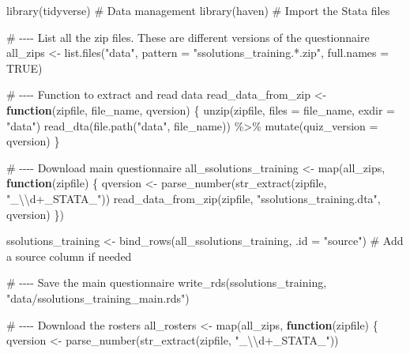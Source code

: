 \documentclass[
  letterpaper,
  DIV=11,
  numbers=noendperiod]{scrreprt}
\newenvironment{Shaded}{\begin{snugshade}}{\end{snugshade}}
\newcommand{\AttributeTok}[1]{\textcolor[rgb]{0.40,0.45,0.13}{#1}}
\newcommand{\CommentTok}[1]{\textcolor[rgb]{0.37,0.37,0.37}{#1}}
\newcommand{\ConstantTok}[1]{\textcolor[rgb]{0.56,0.35,0.01}{#1}}
\newcommand{\ControlFlowTok}[1]{\textcolor[rgb]{0.00,0.23,0.31}{\textbf{#1}}}
\newcommand{\FunctionTok}[1]{\textcolor[rgb]{0.28,0.35,0.67}{#1}}
\newcommand{\NormalTok}[1]{\textcolor[rgb]{0.00,0.23,0.31}{#1}}
\newcommand{\OtherTok}[1]{\textcolor[rgb]{0.00,0.23,0.31}{#1}}
\newcommand{\SpecialCharTok}[1]{\textcolor[rgb]{0.37,0.37,0.37}{#1}}
\newcommand{\StringTok}[1]{\textcolor[rgb]{0.13,0.47,0.30}{#1}}
\begin{document}
\begin{Shaded}
\begin{Highlighting}[]
\FunctionTok{library}\NormalTok{(tidyverse)          }\CommentTok{\# Data management}
\FunctionTok{library}\NormalTok{(haven)              }\CommentTok{\# Import the Stata files}

\CommentTok{\# {-}{-}{-}{-} List all the zip files. These are different versions of the questionnaire}
\NormalTok{all\_zips }\OtherTok{\textless{}{-}} \FunctionTok{list.files}\NormalTok{(}\StringTok{"data"}\NormalTok{, }\AttributeTok{pattern =} \StringTok{"ssolutions\_training.*.zip"}\NormalTok{, }
                       \AttributeTok{full.names =} \ConstantTok{TRUE}\NormalTok{)}

\CommentTok{\# {-}{-}{-}{-} Function to extract and read data}
\NormalTok{read\_data\_from\_zip }\OtherTok{\textless{}{-}} \ControlFlowTok{function}\NormalTok{(zipfile, file\_name, qversion) \{}
  \FunctionTok{unzip}\NormalTok{(zipfile, }\AttributeTok{files =}\NormalTok{ file\_name, }\AttributeTok{exdir =} \StringTok{"data"}\NormalTok{)}
  \FunctionTok{read\_dta}\NormalTok{(}\FunctionTok{file.path}\NormalTok{(}\StringTok{"data"}\NormalTok{, file\_name)) }\SpecialCharTok{\%\textgreater{}\%} \FunctionTok{mutate}\NormalTok{(}\AttributeTok{quiz\_version =}\NormalTok{ qversion)}
\NormalTok{\}}

\CommentTok{\# {-}{-}{-}{-} Download main questionnaire}
\NormalTok{all\_ssolutions\_training }\OtherTok{\textless{}{-}} \FunctionTok{map}\NormalTok{(all\_zips, }\ControlFlowTok{function}\NormalTok{(zipfile) \{}
\NormalTok{  qversion }\OtherTok{\textless{}{-}} \FunctionTok{parse\_number}\NormalTok{(}\FunctionTok{str\_extract}\NormalTok{(zipfile, }\StringTok{"\_}\SpecialCharTok{\textbackslash{}\textbackslash{}}\StringTok{d+\_STATA\_"}\NormalTok{))}
  \FunctionTok{read\_data\_from\_zip}\NormalTok{(zipfile, }\StringTok{"ssolutions\_training.dta"}\NormalTok{, qversion)}
\NormalTok{\})}

\NormalTok{ssolutions\_training }\OtherTok{\textless{}{-}} \FunctionTok{bind\_rows}\NormalTok{(all\_ssolutions\_training, }\AttributeTok{.id =} \StringTok{"source"}\NormalTok{)  }\CommentTok{\# Add a source column if needed}

\CommentTok{\# {-}{-}{-}{-} Save the main questionnaire}
\FunctionTok{write\_rds}\NormalTok{(ssolutions\_training, }\StringTok{"data/ssolutions\_training\_main.rds"}\NormalTok{)}

\CommentTok{\# {-}{-}{-}{-} Download the rosters}
\NormalTok{all\_rosters }\OtherTok{\textless{}{-}} \FunctionTok{map}\NormalTok{(all\_zips, }\ControlFlowTok{function}\NormalTok{(zipfile) \{}
\NormalTok{  qversion }\OtherTok{\textless{}{-}} \FunctionTok{parse\_number}\NormalTok{(}\FunctionTok{str\_extract}\NormalTok{(zipfile, }\StringTok{"\_}\SpecialCharTok{\textbackslash{}\textbackslash{}}\StringTok{d+\_STATA\_"}\NormalTok{))}
  

\end{Highlighting}
\end{Shaded}
\end{document}
